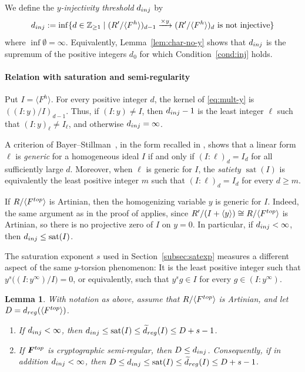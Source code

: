 \documentclass{article}
\newtheorem{lemma}[theorem]{Lemma}
\theoremstyle{definition}
\theoremstyle{plain}
\theoremstyle{plain}
\theoremstyle{plain}
\theoremstyle{plain}
\numberwithin{equation}{subsection}
\begin{document}
We define the {\it $y$-injectivity threshold} $d_{\rm inj}$ by
\begin{equation}
    d_{\rm inj}:=
\inf \{d \in \mathbb{Z}_{\geq 1} \mid (R'/\langle F^h \rangle)_{d-1} \xrightarrow{\times y} (R'/\langle F^h \rangle)_d \mbox{ is not injective} \}
\label{eq:dinj}
\end{equation}
where $\inf\emptyset=\infty$.
Equivalently, Lemma~\ref{lem:char-no-y} shows that $d_{\rm inj}$ is the supremum of the positive integers $d_0$ for which Condition~\ref{cond:inj} holds.

\paragraph{Relation with saturation and semi-regularity}
Put $I=\langle F^h\rangle$.
For every positive integer $d$, the kernel of \eqref{eq:mult-y} is $((I:y)/I)_{d-1}$.
Thus, if $(I:y)\neq I$, then $d_{\rm inj}-1$ is the least
integer $\ell$ such that $(I:y)_\ell\neq I_\ell$, and otherwise $d_{\rm inj}=\infty$.

A criterion of Bayer--Stillman~\cite[Lemma~1.6]{BS}, in the form recalled in \cite[Lemma~2.1]{Hashemi2012}, shows that a linear form $\ell$ is \emph{generic} for a homogeneous ideal $I$ if and only if $(I:\ell)_d=I_d$ for all sufficiently large $d$.
Moreover, when $\ell$ is generic for $I$, the \emph{satiety} $\operatorname{sat}(I)$ is equivalently the least positive integer $m$ such that $(I:\ell)_d=I_d$ for every $d\ge m$.

If $R/\langle F^{\rm top}\rangle$ is Artinian, then the homogenizing variable $y$ is generic for $I$.
Indeed, the same argument as in the proof of \cite[Theorem~11]{CG20} applies, since $R'/(I+\langle y\rangle) \cong R/\langle F^{\rm top}\rangle$ is Artinian, so there is no projective zero of $I$ on $y=0$.
In particular, if $d_{\rm inj}<\infty$, then $d_{\rm inj}\le \operatorname{sat}(I)$.

The saturation exponent $s$ used in Section~\ref{subsec:satexp} measures a different aspect of the same $y$-torsion phenomenon:
It is the least positive integer such that $y^s\bigl((I:y^\infty)/I\bigr)=0$, or equivalently, such that $y^s g\in I$ for every $g\in(I:y^\infty)$.


\begin{lemma}\label{lem:dinj-bounds}
With notation as above, assume that $R/\langle F^{\rm top}\rangle$ is Artinian, and let $D=d_{\rm reg}(\langle F^{\rm top}\rangle)$.
\begin{enumerate}
\item[(1)] If $d_{\rm inj}<\infty$, then $d_{\rm inj} \le \operatorname{sat}(I) \le \widetilde d_{\rm reg}(I) \le D+s-1$.
\item[(2)] If $\bm F^{\rm top}$ is cryptographic semi-regular, then
$D\le d_{\rm inj}$.
Consequently, if in addition $d_{\rm inj}<\infty$, then $D \le d_{\rm inj} \le \operatorname{sat}(I) \le \widetilde d_{\rm reg}(I) \le D+s-1$.
\end{enumerate}
\end{lemma}
\end{document}
